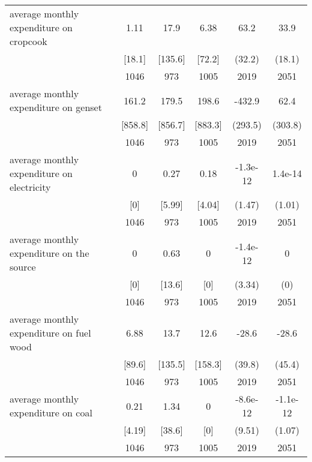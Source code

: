 \begin{table}[htbp]
\begin{tabular*}{0.9\hsize}{@{\hskip\tabcolsep\extracolsep\fill}l*{1}{ccccc}}
average monthly expenditure on cropcook&     1.11&     17.9&     6.38&     63.2\sym{*}  &     33.9\sym{*}  \\
                                &   [18.1]&  [135.6]&   [72.2]&   (32.2)         &   (18.1)         \\
                                &     1046&      973&     1005&     2019         &     2051         \\
average monthly expenditure on genset&    161.2&    179.5&    198.6&   -432.9         &     62.4         \\
                                &  [858.8]&  [856.7]&  [883.3]&  (293.5)         &  (303.8)         \\
                                &     1046&      973&     1005&     2019         &     2051         \\
average monthly expenditure on electricity&        0&     0.27&     0.18& -1.3e-12         &  1.4e-14         \\
                                &      [0]&   [5.99]&   [4.04]&   (1.47)         &   (1.01)         \\
                                &     1046&      973&     1005&     2019         &     2051         \\
average monthly expenditure on  the source&        0&     0.63&        0& -1.4e-12         &        0         \\
                                &      [0]&   [13.6]&      [0]&   (3.34)         &      (0)         \\
                                &     1046&      973&     1005&     2019         &     2051         \\
average monthly expenditure on fuel wood&     6.88&     13.7&     12.6&    -28.6         &    -28.6         \\
                                &   [89.6]&  [135.5]&  [158.3]&   (39.8)         &   (45.4)         \\
                                &     1046&      973&     1005&     2019         &     2051         \\
average monthly expenditure on coal&     0.21&     1.34&        0& -8.6e-12         & -1.1e-12         \\
                                &   [4.19]&   [38.6]&      [0]&   (9.51)         &   (1.07)         \\
                                &     1046&      973&     1005&     2019         &     2051         \\

\end{tabular*}
\end{table}
